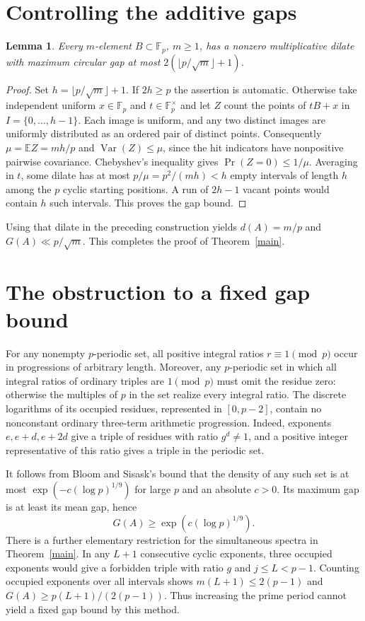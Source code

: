 \documentclass[11pt]{article}
\newcommand{\Fp}{\mathbb F_p}
\newtheorem{lemma}{Lemma}
\begin{document}
\section*{Controlling the additive gaps}
\begin{lemma}
Every $m$-element $B\subset\Fp$, $m\ge1$, has a nonzero multiplicative
dilate with maximum circular gap at most $2(\lfloor p/\sqrt m\rfloor+1)$.
\end{lemma}
\begin{proof}
Set $h=\lfloor p/\sqrt m\rfloor+1$. If $2h\ge p$ the assertion is automatic.
Otherwise take independent uniform $x\in\Fp$ and $t\in\Fp^\times$ and let
$Z$ count the points of $tB+x$ in $I=\{0,\ldots,h-1\}$. Each image is
uniform, and any two distinct images are uniformly distributed as an ordered
pair of distinct points. Consequently $\mu=\mathbb EZ=mh/p$ and
$\operatorname{Var}(Z)\le\mu$, since the hit indicators have nonpositive
pairwise covariance. Chebyshev's inequality gives $\Pr(Z=0)\le1/\mu$.
Averaging in $t$, some dilate has at most $p/\mu=p^2/(mh)<h$ empty
intervals of length $h$ among the $p$ cyclic starting positions. A run of
$2h-1$ vacant points would contain $h$ such intervals. This proves the
gap bound.
\end{proof}
Using that dilate in the preceding construction yields $d(A)=m/p$ and
$G(A)\ll p/\sqrt m$. This completes the proof of Theorem~\ref{main}.

\newpage
\section*{The obstruction to a fixed gap bound}
For any nonempty $p$-periodic set, all positive integral ratios
$r\equiv1\pmod p$ occur in progressions of arbitrary length. Moreover,
any $p$-periodic set in which all integral ratios of ordinary triples are
$1\pmod p$ must omit the residue zero: otherwise the multiples of $p$ in
the set realize every integral ratio. The discrete logarithms of its
occupied residues, represented in $[0,p-2]$, contain no nonconstant
ordinary three-term arithmetic progression. Indeed, exponents $e,e+d,e+2d$
give a triple of residues with ratio $g^d\ne1$, and a positive integer
representative of this ratio gives a triple in the periodic set.

It follows from Bloom and Sisask's bound \cite{bloom} that the density of
any such set is at most $\exp(-c(\log p)^{1/9})$ for large $p$ and an
absolute $c>0$. Its maximum gap is at least its mean gap, hence
\[
                        G(A)\ge \exp(c(\log p)^{1/9}).
\]
There is a further elementary restriction for the simultaneous spectra in
Theorem~\ref{main}. In any $L+1$ consecutive cyclic exponents, three occupied
exponents would give a forbidden triple with ratio $g$ and $j\le L<p-1$.
Counting occupied exponents over all intervals shows
$m(L+1)\le 2(p-1)$ and $G(A)\ge p(L+1)/(2(p-1))$.
Thus increasing the prime period cannot yield a fixed gap bound by this method.
\end{document}
